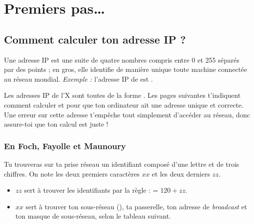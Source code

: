 \section{Premiers pas\ldots}

\subsection{Comment calculer ton adresse IP ?}

\label{calcul_ip}

Une adresse IP est une suite de quatre nombres compris entre 0 et
255 s\'epar\'es par des points ; en gros, elle identifie de mani\`ere
unique toute machine connect\'ee au r\'eseau mondial. \emph{Exemple :}
l'adresse IP de  est .

Les adresses IP de l'X sont toutes de la forme .
Les pages suivantes t'indiquent comment calculer  et  pour que ton
ordinateur ait une adresse unique et correcte. Une erreur sur cette adresse t'emp\^eche tout simplement d'acc\'eder au r\'eseau, donc assure-toi que ton calcul est juste !


\subsubsection{En Foch, Fayolle et Maunoury}
Tu trouveras sur ta prise r\'eseau un identifiant compos\'e d'une lettre et de trois chiffres.
On note les deux premiers caract\`eres $xx$ et les deux derniers $zz$.
\begin{itemize}
\item $zz$ sert \`a trouver les identifiants  par la r\`egle :  = $120 + zz$.

\item $xx$ sert \`a trouver ton sous-r\'eseau (), ta passerelle,
ton adresse de \emph{broadcast} et ton masque de sous-r\'eseau, selon le tableau suivant.
\end{itemize}


